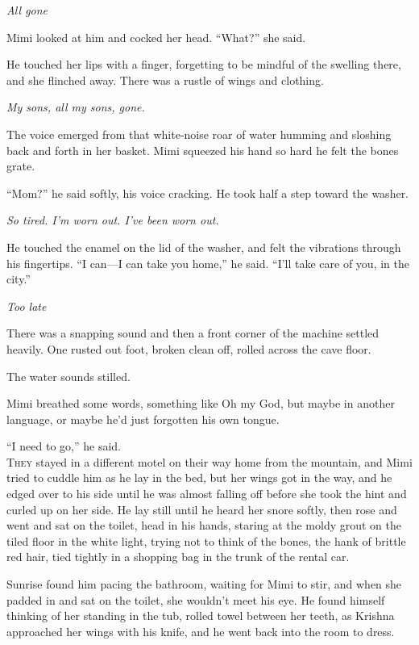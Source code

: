 \textit{All gone}

Mimi looked at him and cocked her head.  ``What?'' she said.

He touched her lips with a finger, forgetting to be mindful of the
swelling there, and she flinched away.  There was a rustle of wings
and clothing.

\textit{My sons, all my sons, gone.}

The voice emerged from that white-noise roar of water humming and
sloshing back and forth in her basket.  Mimi squeezed his hand so hard
he felt the bones grate.

``Mom?'' he said softly, his voice cracking.  He took half a step
toward the washer.

\textit{So tired.  I'm worn out.  I've been worn out.}

He touched the enamel on the lid of the washer, and felt the
vibrations through his fingertips.  ``I can---I can take you home,''
he said.  ``I'll take care of you, in the city.''

\textit{Too late}

There was a snapping sound and then a front corner of the machine
settled heavily.  One rusted out foot, broken clean off, rolled across
the cave floor.

The water sounds stilled.

Mimi breathed some words, something like Oh my God, but maybe in
another language, or maybe he'd just forgotten his own tongue.

``I need to go,'' he said.
\\
\lettrine[lines=3, lhang=.5, nindent=0pt, findent=2pt]{T}{hey} stayed in a different motel on their way home from the mountain,
and Mimi tried to cuddle him as he lay in the bed, but her wings got
in the way, and he edged over to his side until he was almost falling
off before she took the hint and curled up on her side.  He lay still
until he heard her snore softly, then rose and went and sat on the
toilet, head in his hands, staring at the moldy grout on the tiled
floor in the white light, trying not to think of the bones, the hank
of brittle red hair, tied tightly in a shopping bag in the trunk of
the rental car.

Sunrise found him pacing the bathroom, waiting for Mimi to stir, and
when she padded in and sat on the toilet, she wouldn't meet his eye. 
He found himself thinking of her standing in the tub, rolled towel
between her teeth, as Krishna approached her wings with his knife, and
he went back into the room to dress.

